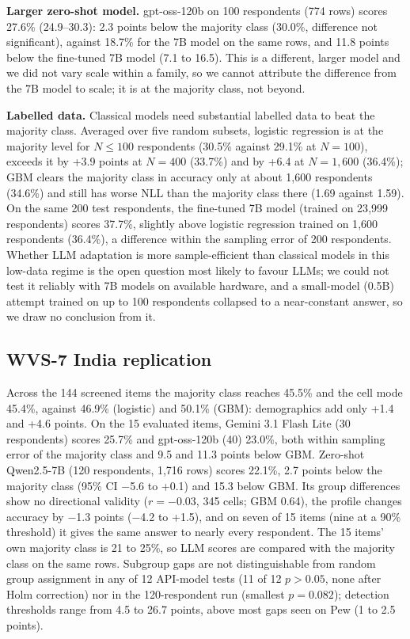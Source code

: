 \documentclass[conference]{IEEEtran}
\begin{document}
\textbf{Larger zero-shot model.} gpt-oss-120b on 100 respondents (774 rows) scores 27.6\% (24.9--30.3): 2.3 points below the majority class (30.0\%, difference not significant), against 18.7\% for the 7B model on the same rows, and 11.8 points below the fine-tuned 7B model (7.1 to 16.5). This is a different, larger model and we did not vary scale within a family, so we cannot attribute the difference from the 7B model to scale; it is at the majority class, not beyond.

\textbf{Labelled data.} Classical models need substantial labelled data to beat the majority class. Averaged over five random subsets, logistic regression is at the majority level for $N\le100$ respondents (30.5\% against 29.1\% at $N=100$), exceeds it by +3.9 points at $N=400$ (33.7\%) and by +6.4 at $N=1{,}600$ (36.4\%); GBM clears the majority class in accuracy only at about 1{,}600 respondents (34.6\%) and still has worse NLL than the majority class there (1.69 against 1.59). On the same 200 test respondents, the fine-tuned 7B model (trained on 23{,}999 respondents) scores 37.7\%, slightly above logistic regression trained on 1{,}600 respondents (36.4\%), a difference within the sampling error of 200 respondents. Whether LLM adaptation is more sample-efficient than classical models in this low-data regime is the open question most likely to favour LLMs; we could not test it reliably with 7B models on available hardware, and a small-model (0.5B) attempt trained on up to 100 respondents collapsed to a near-constant answer, so we draw no conclusion from it.

\subsection{WVS-7 India replication}

Across the 144 screened items the majority class reaches 45.5\% and the cell mode 45.4\%, against 46.9\% (logistic) and 50.1\% (GBM): demographics add only +1.4 and +4.6 points. On the 15 evaluated items, Gemini 3.1 Flash Lite (30 respondents) scores 25.7\% and gpt-oss-120b (40) 23.0\%, both within sampling error of the majority class and 9.5 and 11.3 points below GBM. Zero-shot Qwen2.5-7B (120 respondents, 1{,}716 rows) scores 22.1\%, 2.7 points below the majority class (95\% CI $-$5.6 to +0.1) and 15.3 below GBM. Its group differences show no directional validity ($r={-0.03}$, 345 cells; GBM 0.64), the profile changes accuracy by $-$1.3 points ($-$4.2 to +1.5), and on seven of 15 items (nine at a 90\% threshold) it gives the same answer to nearly every respondent. The 15 items' own majority class is 21 to 25\%, so LLM scores are compared with the majority class on the same rows. Subgroup gaps are not distinguishable from random group assignment in any of 12 API-model tests (11 of 12 $p>0.05$, none after Holm correction) nor in the 120-respondent run (smallest $p=0.082$); detection thresholds range from 4.5 to 26.7 points, above most gaps seen on Pew (1 to 2.5 points).
\end{document}
